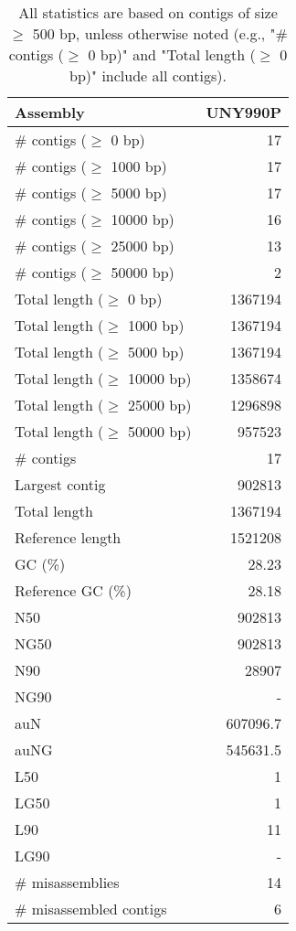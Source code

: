 \documentclass[12pt,a4paper]{article}
\begin{document}
\begin{table}[ht]
\begin{center}
\caption{All statistics are based on contigs of size $\geq$ 500 bp, unless otherwise noted (e.g., "\# contigs ($\geq$ 0 bp)" and "Total length ($\geq$ 0 bp)" include all contigs).}
\begin{tabular}{|l*{1}{|r}|}
\hline
Assembly & UNY990P \\ \hline
\# contigs ($\geq$ 0 bp) & 17 \\ \hline
\# contigs ($\geq$ 1000 bp) & 17 \\ \hline
\# contigs ($\geq$ 5000 bp) & 17 \\ \hline
\# contigs ($\geq$ 10000 bp) & 16 \\ \hline
\# contigs ($\geq$ 25000 bp) & 13 \\ \hline
\# contigs ($\geq$ 50000 bp) & 2 \\ \hline
Total length ($\geq$ 0 bp) & 1367194 \\ \hline
Total length ($\geq$ 1000 bp) & 1367194 \\ \hline
Total length ($\geq$ 5000 bp) & 1367194 \\ \hline
Total length ($\geq$ 10000 bp) & 1358674 \\ \hline
Total length ($\geq$ 25000 bp) & 1296898 \\ \hline
Total length ($\geq$ 50000 bp) & 957523 \\ \hline
\# contigs & 17 \\ \hline
Largest contig & 902813 \\ \hline
Total length & 1367194 \\ \hline
Reference length & 1521208 \\ \hline
GC (\%) & 28.23 \\ \hline
Reference GC (\%) & 28.18 \\ \hline
N50 & 902813 \\ \hline
NG50 & 902813 \\ \hline
N90 & 28907 \\ \hline
NG90 & - \\ \hline
auN & 607096.7 \\ \hline
auNG & 545631.5 \\ \hline
L50 & 1 \\ \hline
LG50 & 1 \\ \hline
L90 & 11 \\ \hline
LG90 & - \\ \hline
\# misassemblies & 14 \\ \hline
\# misassembled contigs & 6 \\ \hline

\end{tabular}
\end{center}
\end{table}
\end{document}
